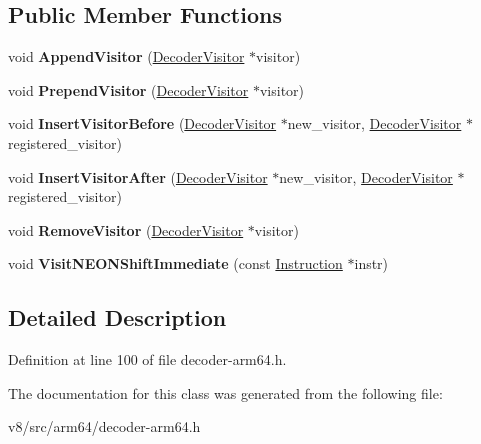 \subsection*{Public Member Functions}
\begin{DoxyCompactItemize}
\item 
\mbox{\label{classv8_1_1internal_1_1DispatchingDecoderVisitor_a2cc18d6c2d3dca656181b68eb092ee9d}} 
void {\bfseries Append\+Visitor} (\mbox{\hyperlink{classv8_1_1internal_1_1DecoderVisitor}{Decoder\+Visitor}} $\ast$visitor)
\item 
\mbox{\label{classv8_1_1internal_1_1DispatchingDecoderVisitor_a9bde00a60970d0d420b3ba8fe2e6ea26}} 
void {\bfseries Prepend\+Visitor} (\mbox{\hyperlink{classv8_1_1internal_1_1DecoderVisitor}{Decoder\+Visitor}} $\ast$visitor)
\item 
\mbox{\label{classv8_1_1internal_1_1DispatchingDecoderVisitor_a11f1b7b5caa21fe5087601997b800f25}} 
void {\bfseries Insert\+Visitor\+Before} (\mbox{\hyperlink{classv8_1_1internal_1_1DecoderVisitor}{Decoder\+Visitor}} $\ast$new\+\_\+visitor, \mbox{\hyperlink{classv8_1_1internal_1_1DecoderVisitor}{Decoder\+Visitor}} $\ast$registered\+\_\+visitor)
\item 
\mbox{\label{classv8_1_1internal_1_1DispatchingDecoderVisitor_a4c61ff92560304b911a7f188921cd99c}} 
void {\bfseries Insert\+Visitor\+After} (\mbox{\hyperlink{classv8_1_1internal_1_1DecoderVisitor}{Decoder\+Visitor}} $\ast$new\+\_\+visitor, \mbox{\hyperlink{classv8_1_1internal_1_1DecoderVisitor}{Decoder\+Visitor}} $\ast$registered\+\_\+visitor)
\item 
\mbox{\label{classv8_1_1internal_1_1DispatchingDecoderVisitor_afb3200eb3db0b8b11b24a752eee5f03c}} 
void {\bfseries Remove\+Visitor} (\mbox{\hyperlink{classv8_1_1internal_1_1DecoderVisitor}{Decoder\+Visitor}} $\ast$visitor)
\item 
\mbox{\label{classv8_1_1internal_1_1DispatchingDecoderVisitor_aa1dbbd237c4b99fcce66482fd25750d8}} 
void {\bfseries Visit\+N\+E\+O\+N\+Shift\+Immediate} (const \mbox{\hyperlink{classv8_1_1internal_1_1Instruction}{Instruction}} $\ast$instr)
\end{DoxyCompactItemize}


\subsection{Detailed Description}


Definition at line 100 of file decoder-\/arm64.\+h.



The documentation for this class was generated from the following file\+:\begin{DoxyCompactItemize}
\item 
v8/src/arm64/decoder-\/arm64.\+h\end{DoxyCompactItemize}
